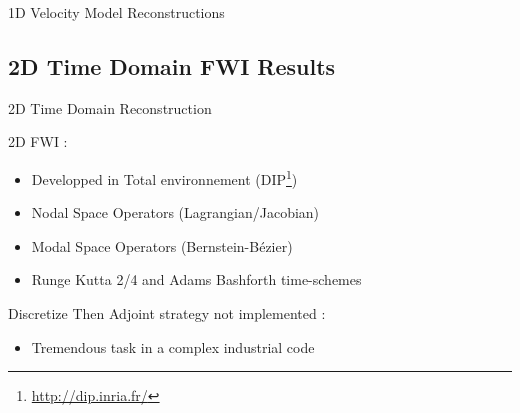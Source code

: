 \begin{frame}{1D Velocity Model Reconstructions}

\end{frame}






\subsection{2D Time Domain FWI Results}
\begin{frame}{2D Time Domain Reconstruction}

2D FWI :
\begin{itemize}
\item Developped in Total environnement (DIP\footnote{\url{http://dip.inria.fr/}})
\item Nodal Space Operators (Lagrangian/Jacobian)
\item Modal Space Operators (Bernstein-Bézier)
\item Runge Kutta 2/4 and Adams Bashforth time-schemes
\end{itemize}
\vspace{0.5cm}
Discretize Then Adjoint strategy not implemented :
\begin{itemize}
\item Tremendous task in a complex industrial code
\end{itemize}
\end{frame}


